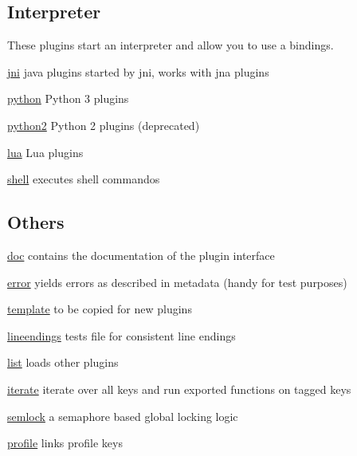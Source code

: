 \subsection*{Interpreter}

These plugins start an interpreter and allow you to use a bindings.


\begin{DoxyItemize}
\item \hyperlink{md_src_plugins_jni_README_src_plugins_jni_README_md}{jni} java plugins started by jni, works with jna plugins
\item \hyperlink{md_src_plugins_python_README_src_plugins_python_README_md}{python} Python 3 plugins
\item \hyperlink{md_src_plugins_python2_README_src_plugins_python2_README_md}{python2} Python 2 plugins (deprecated)
\item \hyperlink{md_src_plugins_lua_README_src_plugins_lua_README_md}{lua} Lua plugins
\item \hyperlink{md_src_plugins_shell_README_src_plugins_shell_README_md}{shell} executes shell commandos
\end{DoxyItemize}

\subsection*{Others}


\begin{DoxyItemize}
\item \hyperlink{md_src_plugins_doc_README_src_plugins_doc_README_md}{doc} contains the documentation of the plugin interface
\item \hyperlink{md_src_plugins_error_README_src_plugins_error_README_md}{error} yields errors as described in metadata (handy for test purposes)
\item \hyperlink{md_src_plugins_template_README_src_plugins_template_README_md}{template} to be copied for new plugins
\item \hyperlink{md_src_plugins_lineendings_README_src_plugins_lineendings_README_md}{lineendings} tests file for consistent line endings
\item \hyperlink{md_src_plugins_list_README_src_plugins_list_README_md}{list} loads other plugins
\item \hyperlink{md_src_plugins_iterate_README_src_plugins_iterate_README_md}{iterate} iterate over all keys and run exported functions on tagged keys
\item \hyperlink{md_src_plugins_semlock_README_src_plugins_semlock_README_md}{semlock} a semaphore based global locking logic
\item \hyperlink{md_src_plugins_profile_README_src_plugins_profile_README_md}{profile} links profile keys 
\end{DoxyItemize}